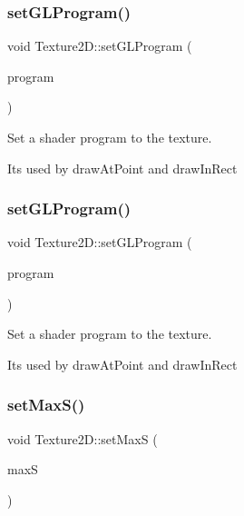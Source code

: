 \subsubsection{\texorpdfstring{set\+G\+L\+Program()}{setGLProgram()}\hspace{0.1cm}{\footnotesize\ttfamily [1/2]}}
{\footnotesize\ttfamily void Texture2\+D\+::set\+G\+L\+Program (\begin{DoxyParamCaption}\item[{\hyperlink{classGLProgram}{G\+L\+Program} $\ast$}]{program }\end{DoxyParamCaption})}

Set a shader program to the texture.

It\textquotesingle{}s used by draw\+At\+Point and draw\+In\+Rect \mbox{\label{classTexture2D_ab1e3f2bdc255d893dfc6ad541ceb29c0}} 
\subsubsection{\texorpdfstring{set\+G\+L\+Program()}{setGLProgram()}\hspace{0.1cm}{\footnotesize\ttfamily [2/2]}}
{\footnotesize\ttfamily void Texture2\+D\+::set\+G\+L\+Program (\begin{DoxyParamCaption}\item[{\hyperlink{classGLProgram}{G\+L\+Program} $\ast$}]{program }\end{DoxyParamCaption})}

Set a shader program to the texture.

It\textquotesingle{}s used by draw\+At\+Point and draw\+In\+Rect \mbox{\label{classTexture2D_afff3f3a59a2fec96d6a343a7e4c2ea97}} 
\subsubsection{\texorpdfstring{set\+Max\+S()}{setMaxS()}\hspace{0.1cm}{\footnotesize\ttfamily [1/2]}}
{\footnotesize\ttfamily void Texture2\+D\+::set\+MaxS (\begin{DoxyParamCaption}\item[{G\+Lfloat}]{maxS }\end{DoxyParamCaption})}

